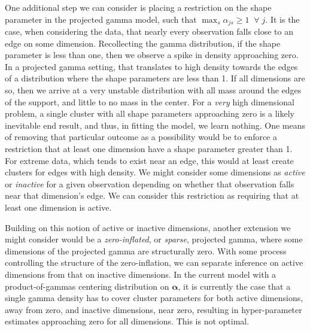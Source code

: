 One additional step we can consider is placing a restriction on the shape parameter in the projected
    gamma model, such that $\max_s \alpha_{js} \geq 1\;\;\forall\;j$.  It is the case, when considering 
    the data, that nearly every observation falls close to an edge on some dimension.
    Recollecting the gamma distribution, if the shape 
    parameter is less than one, then we observe a spike in density approaching zero.  In a projected 
    gamma setting, that translates to high density towards the edges of a distribution 
    where the shape parameters are less than 1.  If all dimensions are so, then we arrive at a very 
    unstable distribution with all mass around the edges of the support, and little to no mass in the 
    center.  For a \emph{very} high dimensional problem, a single cluster with all shape parameters
    approaching zero is a likely inevitable end result, and thus, in fitting the model, we learn nothing.
    One means of removing that particular outcome as a possibility would be to enforce a restriction 
    that at least one dimension have a shape parameter greater than 1.  For extreme data, which tends
    to exist near an edge, this would at least create clusters for edges with high density.
    We might consider some dimensions as \emph{active} or \emph{inactive} for a given observation
    depending on whether that observation falls near that dimension's edge.  We can consider this
    restriction as requiring that at least one dimension is active.

Building on this notion of active or inactive dimensions, another extension we might consider would be
    a \emph{zero-inflated}, or \emph{sparse}, projected gamma, where some dimensions of the projected 
    gamma are structurally zero.  With some process controlling the structure of the zero-inflation,
    we can separate inference on active dimensions from that on inactive dimensions.  In the current model
    with a product-of-gammas centering distribution on $\bm{\alpha}$, it is currently the case that a
    single gamma density has to cover cluster parameters for both active dimensions, away from zero, 
    and inactive dimensions, near zero, resulting in hyper-parameter estimates approaching zero for 
    all dimensions.  This is not optimal.

